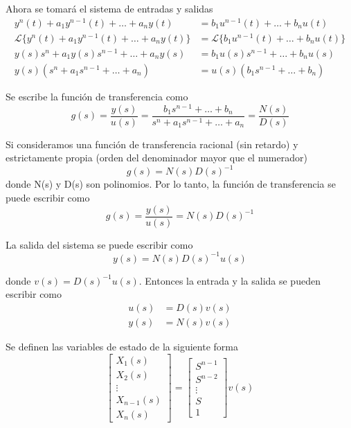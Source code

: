 Ahora se tomará el sistema de entradas y salidas
\[
    \begin{split}
        y^{n}(t) + a_{1}y^{n-1}(t) + \ldots + a_{n}y(t) & = b_{1}u^{n-1}(t) + \ldots + b_{n}u(t) \\
        \mathcal{L} \{ y^{n}(t) + a_{1}y^{n-1}(t) + \ldots + a_{n}y(t) \} & = \mathcal{L} \{ b_{1}u^{n-1}(t) + \ldots + b_{n}u(t) \}\\
        y(s)s^{n} + a_{1}y(s)s^{n-1} + \ldots + a_{n}y(s) & = b_{1}u(s)s^{n-1} + \ldots + b_{n}u(s)\\
        y(s) (s^{n} + a_{1}s^{n-1} +\ldots + a_{n} ) & = u(s) (b_{1}s^{n-1} + \ldots + b_{n})
    \end{split}
\]

Se escribe la función de transferencia como 
\[
    g(s) = \frac{y(s)}{u(s)} = \frac{ b_{1}s^{n-1} + \ldots + b_{n} }{ s^{n} + a_{1}s^{n-1} +\ldots + a_{n} } = \frac{N(s)}{D(s)}
\]

Si consideramos una función de transferencia racional (sin retardo) y estrictamente propia (orden del denominador mayor que el numerador)
\[
    g(s)=N(s)D(s)^{-1}
\]
donde N(s) y D(s) son polinomios. Por lo tanto, la función de transferencia se puede escribir como 
\[
    g(s) = \frac{y(s)}{u(s)} = N(s)D(s)^{-1}
\]

La salida del sistema se puede escribir como 
\[
    y(s) = N(s)D(s)^{-1}u(s)
\]

donde \( v(s) = D(s)^{-1}u(s) \). Entonces la entrada y la salida se pueden escribir como 
\[
    \begin{split}
        u(s) & = D(s)v(s) \\
        y(s) & = N(s)v(s)
    \end{split}
\]

Se definen las variables de estado de la siguiente forma
\[ 
    \begin{bmatrix}
        X_{1}(s) \\
        X_{2}(s) \\
        \vdots \\
        X_{n-1}(s) \\
        X_{n}(s)
    \end{bmatrix}
    =
    \begin{bmatrix}
        S^{n-1} \\
        S^{n-2}\\
        \vdots \\
        S \\
        1
    \end{bmatrix} v(s)
\]

